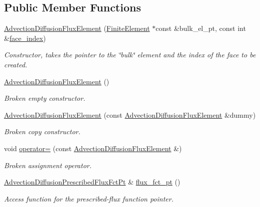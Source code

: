 \subsection*{Public Member Functions}
\begin{DoxyCompactItemize}
\item 
\hyperlink{classoomph_1_1AdvectionDiffusionFluxElement_acdb4a523d9680f6f42128044591c73e0}{Advection\+Diffusion\+Flux\+Element} (\hyperlink{classoomph_1_1FiniteElement}{Finite\+Element} $\ast$const \&bulk\+\_\+el\+\_\+pt, const int \&\hyperlink{classoomph_1_1FaceElement_a478d577ac6db67ecc80f1f02ae3ab170}{face\+\_\+index})
\begin{DoxyCompactList}\small\item\em Constructor, takes the pointer to the \char`\"{}bulk\char`\"{} element and the index of the face to be created. \end{DoxyCompactList}\item 
\hyperlink{classoomph_1_1AdvectionDiffusionFluxElement_af91991cc6e255d038f0f8443e0339643}{Advection\+Diffusion\+Flux\+Element} ()
\begin{DoxyCompactList}\small\item\em Broken empty constructor. \end{DoxyCompactList}\item 
\hyperlink{classoomph_1_1AdvectionDiffusionFluxElement_a187a597274ed7d129da3b1cd89196f44}{Advection\+Diffusion\+Flux\+Element} (const \hyperlink{classoomph_1_1AdvectionDiffusionFluxElement}{Advection\+Diffusion\+Flux\+Element} \&dummy)
\begin{DoxyCompactList}\small\item\em Broken copy constructor. \end{DoxyCompactList}\item 
void \hyperlink{classoomph_1_1AdvectionDiffusionFluxElement_ad14ac8c65798fc1ed5e28ec2d969f147}{operator=} (const \hyperlink{classoomph_1_1AdvectionDiffusionFluxElement}{Advection\+Diffusion\+Flux\+Element} \&)
\begin{DoxyCompactList}\small\item\em Broken assignment operator. \end{DoxyCompactList}\item 
\hyperlink{classoomph_1_1AdvectionDiffusionFluxElement_aeb9eb0a65d6dfe3673f6910a6fd7cf59}{Advection\+Diffusion\+Prescribed\+Flux\+Fct\+Pt} \& \hyperlink{classoomph_1_1AdvectionDiffusionFluxElement_a8d78c95241fe2615ea63040e4072627d}{flux\+\_\+fct\+\_\+pt} ()
\begin{DoxyCompactList}\small\item\em Access function for the prescribed-\/flux function pointer. \end{DoxyCompactList}\item 

\end{DoxyCompactItemize}
